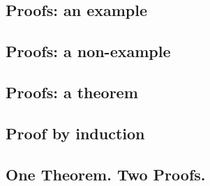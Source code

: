 \subsection{Proofs: an example}

\subsection{Proofs: a non-example}

\subsection{Proofs: a theorem}

\subsection{Proof by induction}

\subsection{One Theorem. Two Proofs.}
